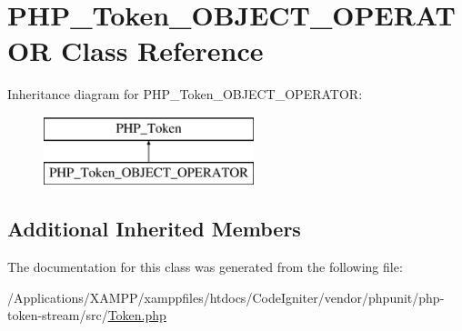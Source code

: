 \hypertarget{class_p_h_p___token___o_b_j_e_c_t___o_p_e_r_a_t_o_r}{}\section{P\+H\+P\+\_\+\+Token\+\_\+\+O\+B\+J\+E\+C\+T\+\_\+\+O\+P\+E\+R\+A\+T\+OR Class Reference}
\label{class_p_h_p___token___o_b_j_e_c_t___o_p_e_r_a_t_o_r}
Inheritance diagram for P\+H\+P\+\_\+\+Token\+\_\+\+O\+B\+J\+E\+C\+T\+\_\+\+O\+P\+E\+R\+A\+T\+OR\+:\begin{figure}[H]
\begin{center}
\leavevmode
\includegraphics[height=2.000000cm]{class_p_h_p___token___o_b_j_e_c_t___o_p_e_r_a_t_o_r}
\end{center}
\end{figure}
\subsection*{Additional Inherited Members}


The documentation for this class was generated from the following file\+:\begin{DoxyCompactItemize}
\item 
/\+Applications/\+X\+A\+M\+P\+P/xamppfiles/htdocs/\+Code\+Igniter/vendor/phpunit/php-\/token-\/stream/src/\mbox{\hyperlink{_token_8php}{Token.\+php}}\end{DoxyCompactItemize}
